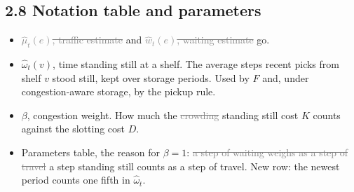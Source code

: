 \documentclass[11pt,a4paper]{article}
\newcommand{\new}[1]{\textcolor{newc}{#1}}
\newcommand{\old}[1]{\textcolor{gray}{\sout{#1}}}
\begin{document}
\subsection*{2.8 Notation table and parameters}
\begin{itemize}[leftmargin=1.2em]
\item \old{\(\hat\mu_t(e)\), traffic estimate} and \old{\(\hat w_t(e)\), waiting estimate} go.
\item \new{\(\hat\omega_t(v)\), time standing still at a shelf. The average steps
  recent picks from shelf \(v\) stood still, kept over storage periods. Used by
  \(F\) and, under congestion-aware storage, by the pickup rule.}
\item \(\beta\), congestion weight. How much the \old{crowding} \new{standing still}
  cost \(K\) counts against the slotting cost \(D\).
\item Parameters table, the reason for \(\beta = 1\): \old{a step of waiting weighs
  as a step of travel} \new{a step standing still counts as a step of travel}.
  \new{New row: the newest period counts one fifth in $\hat\omega_t$.}
\end{itemize}
\end{document}
